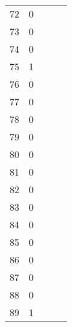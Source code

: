\begin{center}
\begin{table}[H]
\begin{tabular}{ccccc}
\num{   72} & \num{    0} \\
\num{   73} & \num{    0} \\
\num{   74} & \num{    0} \\
\num{   75} & \num{    1} \\
\num{   76} & \num{    0} \\
\num{   77} & \num{    0} \\
\num{   78} & \num{    0} \\
\num{   79} & \num{    0} \\
\num{   80} & \num{    0} \\
\num{   81} & \num{    0} \\
\num{   82} & \num{    0} \\
\num{   83} & \num{    0} \\
\num{   84} & \num{    0} \\
\num{   85} & \num{    0} \\
\num{   86} & \num{    0} \\
\num{   87} & \num{    0} \\
\num{   88} & \num{    0} \\
\num{   89} & \num{    1} \\
\bottomrule
\end{tabular}
\end{table}
\end{center}
